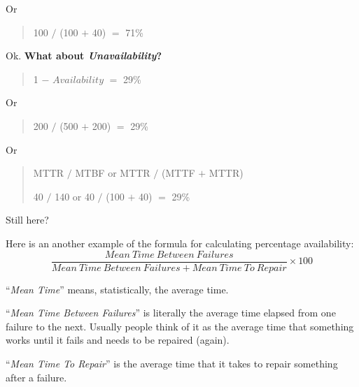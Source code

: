 Or

\begin{quote}
100 $/$ (100 $+$ 40)  $=$  71\%
\end{quote}

Ok. \textbf{What about \emph{Unavailability}?}

\begin{quote}
1  $-$  $Availability$  $=$  29\%
\end{quote}

Or
\begin{quote}
200  $/$  (500  $+$  200)  $=$  29\%
\end{quote}

Or

\begin{quote}
MTTR $/$ MTBF or MTTR $/$ (MTTF $+$ MTTR)

40 $/$ 140 or 40 $/$  (100  $+$ 40)  $=$  29\%
\end{quote}

Still here?

Here is an another example of the formula for calculating percentage availability: 
\begin{equation}\label{eq:Percentage Availability}
\frac{Mean~Time~Between~Failures}{Mean~Time~Between~Failures  +  Mean~Time~To~Repair} \times 100
\end{equation}

“\textit{Mean Time}” means, statistically, the average time.

“\textit{Mean Time Between Failures}” is literally the average time elapsed from one failure to the next.  Usually people think of it as the average time that something works until it fails and needs to be repaired (again).

“\textit{Mean Time To Repair}” is the average time that it takes to repair something after a failure.
